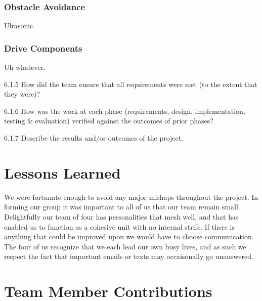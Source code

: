 \documentclass[12pt,letterpaper]{article}
\begin{document}
\subsubsection{Obstacle Avoidance}
Ulrasonic.
\subsubsection{Drive Components}
Uh whatever.



6.1.5 How did the team ensure that all requirements were met (to the extent that they were)?

6.1.6 How was the work at each phase (requirements, design, implementation, testing \& evaluation) verified against the outcomes of prior phases?

6.1.7 Describe the results and/or outcomes of the project.

\section{Lessons Learned}


We were fortunate enough to avoid any major mishaps throughout the project. In
forming our group it was important to all of us that our team remain small.
Delightfully our team of four has personalities that mesh well, and that has
enabled us to function as a cohesive unit with no internal strife.
If there is anything that could be improved upon we would have to choose
communication.  The four of us recognize that we each lead our own busy lives,
and as such we respect the fact that important emails or texts may occaisonally
go unanswered.


\section{Team Member Contributions}
\end{document}

